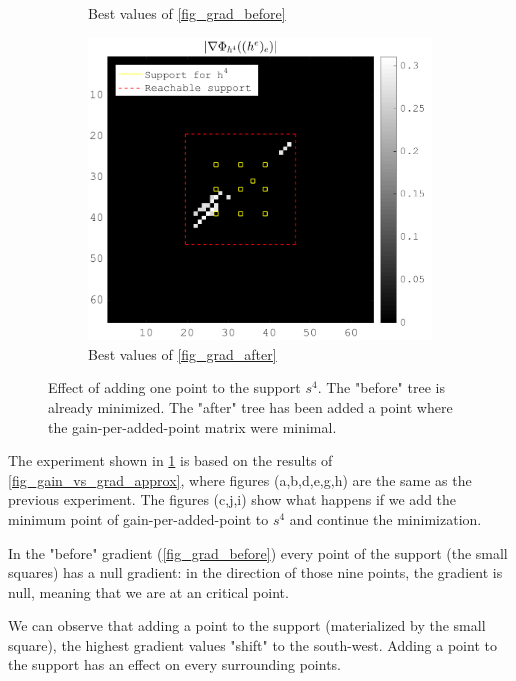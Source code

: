 \begin{figure}[!ht]
\begin{subfigure}[b]{0.32\textwidth}
\caption{Best values of \ref{fig_grad_before}}
\end{subfigure}
\begin{subfigure}[b]{0.32\textwidth}\centering
\includegraphics[width=\textwidth]{figures/before_after/xp_128x128_sc2_angl1_K3_S3_node4after_partgrad4_bestvalues.png}
\caption{Best values of \ref{fig_grad_after}}
\end{subfigure}
\caption{Effect of adding one point to the support $s^4$. The "before" tree is already minimized. The "after" tree has been added a point where the gain-per-added-point matrix were minimal.} \label{fig_before_after_adding}
\end{figure}

The experiment shown in \cref{fig_before_after_adding} is based on the results of \cref{fig_gain_vs_grad_approx}, where figures (a,b,d,e,g,h) are the same as the previous experiment. The figures (c,j,i) show what  happens if we add the minimum point of gain-per-added-point to $s^4$ and continue the minimization.

In the "before" gradient (\cref{fig_grad_before}) every point of the support (the small squares) has a null gradient: in the direction of those nine points, the gradient is null, meaning that we are at an critical point.

We can observe that adding a point to the support (materialized by the  small square), the highest gradient values "shift" to the south-west. Adding a point to the support has an effect on every surrounding points.

